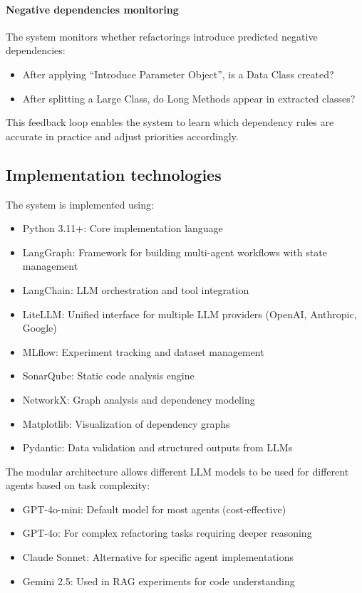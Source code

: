 \paragraph{Negative dependencies monitoring}
The system monitors whether refactorings introduce predicted negative dependencies:
\begin{itemize}
    \item After applying ``Introduce Parameter Object'', is a Data Class created?
    \item After splitting a Large Class, do Long Methods appear in extracted classes?
\end{itemize}

This feedback loop enables the system to learn which dependency rules are accurate in practice and adjust priorities accordingly.

\subsection{Implementation technologies}

The system is implemented using:

\begin{itemize}
    \item Python 3.11+: Core implementation language
    \item LangGraph: Framework for building multi-agent workflows with state management
    \item LangChain: LLM orchestration and tool integration
    \item LiteLLM: Unified interface for multiple LLM providers (OpenAI, Anthropic, Google)
    \item MLflow: Experiment tracking and dataset management
    \item SonarQube: Static code analysis engine
    \item NetworkX: Graph analysis and dependency modeling
    \item Matplotlib: Visualization of dependency graphs
    \item Pydantic: Data validation and structured outputs from LLMs
\end{itemize}

The modular architecture allows different LLM models to be used for different agents based on task complexity:
\begin{itemize}
    \item GPT-4o-mini: Default model for most agents (cost-effective)
    \item GPT-4o: For complex refactoring tasks requiring deeper reasoning
    \item Claude Sonnet: Alternative for specific agent implementations
    \item Gemini 2.5: Used in RAG experiments for code understanding
\end{itemize}

